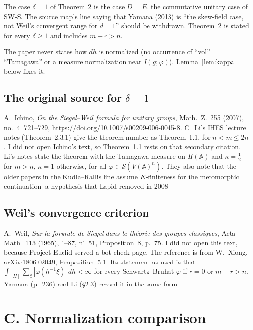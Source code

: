 \documentclass[11pt]{article}
\theoremstyle{definition}
\begin{document}
The case $\delta=1$ of Theorem~2 is the case $D=E$, the commutative unitary case of SW-S. The source map's line saying that Yamana (2013) is ``the skew-field case, not Weil's convergent range for $d=1$'' should be withdrawn. Theorem~2 is stated for every $\delta\ge1$ and includes $m-r>n$.

The paper never states how $dh$ is normalized (no occurrence of ``vol'', ``Tamagawa'' or a measure normalization near $I(g;\varphi)$). Lemma~\ref{lem:kappa} below fixes it.

\subsection{The original source for $\delta=1$}

A.~Ichino, \emph{On the Siegel--Weil formula for unitary groups}, Math.\ Z.\ 255 (2007), no.~4, 721--729, \url{https://doi.org/10.1007/s00209-006-0045-8}. C.~Li's IHES lecture notes (Theorem~2.3.1) give the theorem number as Theorem~1.1, for $n<m\le 2n$. I did not open Ichino's text, so Theorem~1.1 rests on that secondary citation. Li's notes state the theorem with the Tamagawa measure on $H(\mathbb A)$ and $\kappa=\frac12$ for $m>n$, $\kappa=1$ otherwise, for all $\varphi\in\mathcal S(V(\mathbb A)^n)$. They also note that the older papers in the Kudla--Rallis line assume $K$-finiteness for the meromorphic continuation, a hypothesis that Lapid removed in 2008.

\subsection{Weil's convergence criterion}

A.~Weil, \emph{Sur la formule de Siegel dans la théorie des groupes classiques}, Acta Math.\ 113 (1965), 1--87, n$^\circ$~51, Proposition~8, p.~75. I did not open this text, because Project Euclid served a bot-check page. The reference is from W.~Xiong, arXiv:1806.02049, Proposition~5.1. Its statement as used is that $\int_{[H]}\sum_\xi|\varphi(h^{-1}\xi)|\,dh<\infty$ for every Schwartz--Bruhat $\varphi$ if $r=0$ or $m-r>n$. Yamana (p.~236) and Li (§2.3) record it in the same form.

\section{C. Normalization comparison}\label{sec:table}
\end{document}
